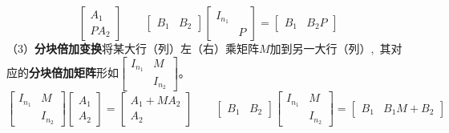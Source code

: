 \documentclass[10pt, a4paper, oneside, fontset=none]{ctexart}
\theoremstyle{plain}
\theoremstyle{definition}
\newcommand{\com}{,\,\,\,\:}
\newcommand{\tboba}[1]{\textbf{\kai\color{bali!75!black}#1}}
\begin{document}
{$$\begin{bmatrix}
        A_1\\PA_2
    \end{bmatrix}\quad\quad \begin{bmatrix}
        B_1& B_2
    \end{bmatrix}\begin{bmatrix}
        I_{n_1} & \\ & P
    \end{bmatrix}=\begin{bmatrix}
        B_1 & B_2P
    \end{bmatrix}$$
    （3）\tboba{分块倍加变换}\quad 将某大行（列）左（右）乘矩阵$M$加到另一大行（列）\com 其对应的\tboba{分块倍加矩阵}形如${\begin{bmatrix}
        I_{n_1} & M\\ & I_{n_2}
    \end{bmatrix}}$。
    $$\begin{bmatrix}
        I_{n_1} & M\\ & I_{n_2}
    \end{bmatrix}\begin{bmatrix}
        A_1\\A_2
    \end{bmatrix}=\begin{bmatrix}
        A_1+MA_2\\A_2
    \end{bmatrix}\quad\quad \begin{bmatrix}
        B_1& B_2
    \end{bmatrix}\begin{bmatrix}
        I_{n_1} & M\\ & I_{n_2}
    \end{bmatrix}=\begin{bmatrix}
        B_1 & B_1M+B_2
    \end{bmatrix}$$
}
\end{document}
